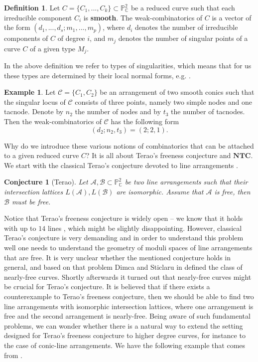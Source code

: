 \documentclass[12pt]{article}
\theoremstyle{plain}
\newtheorem{conjecture}[thm]{Conjecture}
\theoremstyle{definition}
\newtheorem{definition}[thm]{Definition}
\newtheorem{example}[thm]{Example}
\begin{document}
\begin{definition}
Let $C = \{C_{1}, ..., C_{k}\} \subset \mathbb{P}^{2}_{\mathbb{C}}$ be a reduced curve such that each irreducible component $C_{i}$ is \textbf{smooth}. The weak-combinatorics of $C$ is a vector of the form $(d_{1}, ..., d_{s}; m_{1}, ..., m_{p})$, where $d_{i}$ denotes the number of irreducible components of $C$ of degree $i$, and $m_{j}$ denotes the number of singular points of a curve $C$ of a given type $M_{j}$.
\end{definition}
In the above definition we refer to types of singularities, which means that for us these types are determined by their local normal forms, e.g. \cite{arnold}.
\begin{example}
Let $\mathcal{C} = \{C_{1}, C_{2}\}$ be an arrangement of two smooth conics such that the singular locus of $\mathcal{C}$ consists of three points, namely two simple nodes and one tacnode. Denote by $n_{2}$ the number of nodes and by $t_{3}$ the number of tacnodes. Then the weak-combinatorics of $\mathcal{C}$ has the following form
$$(d_{2};n_{2},t_{3}) = (2;2,1).$$
\end{example}
Why do we introduce these various notions of combinatorics that can be attached to a given reduced curve $C$? It is all about Terao's freeness conjecture and $\textbf{NTC}$.
We start with the classical Terao's conjecture devoted to line arrangements \cite{terao}.
\begin{conjecture}[Terao]
Let $\mathcal{A},\mathcal{B} \subset \mathbb{P}^{2}_{\mathbb{C}}$ be two line arrangements such that their intersection lattices $L(\mathcal{A}), L(\mathcal{B})$ are isomorphic. Assume that $\mathcal{A}$ is free, then $\mathcal{B}$ must be free.
\end{conjecture}
Notice that Terao's freeness conjecture is widely open -- we know that it holds with up to $14$ lines \cite{BarKuh}, which might be slightly disappointing. However, classical Terao's conjecture is very demanding and in order to understand this problem well one needs to understand the geometry of moduli spaces of line arrangements that are free. It is very unclear whether the mentioned conjecture holds in general, and based on that problem Dimca and Sticlaru in \cite{DimcaSticlaru} defined the class of nearly-free curves. Shortly afterwards it turned out that nearly-free curves might be crucial for Terao's conjecture. It is believed that if there exists a counterexample to Terao's freeness conjecture, then we should be able to find two line arrangements with isomorphic intersection lattices, where one arrangement is free and the second arrangement is nearly-free. Being aware of such fundamental problems, we can wonder whether there is a natural way to extend the setting designed for Terao's freeness conjecture to higher degree curves, for instance to the case of conic-line arrangements. We have the following example that comes from \cite{STo}.
\end{document}
